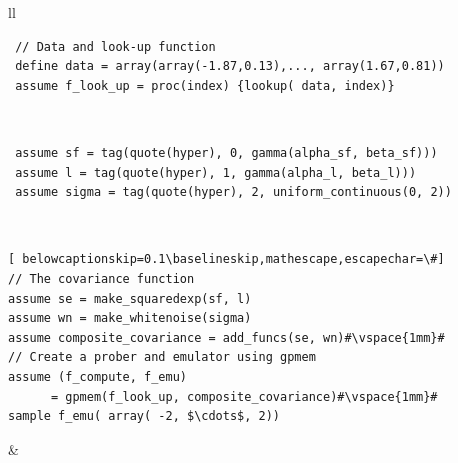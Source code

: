 \begin{tabular}{ll} \hline
{}
  \begin{minipage}{4cm}
 \footnotesize\begin{lstlisting}
 // Data and look-up function
 define data = array(array(-1.87,0.13),..., array(1.67,0.81)) 
 assume f_look_up = proc(index) {lookup( data, index)}
\end{lstlisting}
\end{minipage}\\
\hline
{}
  \begin{minipage}{4cm}
 \footnotesize\begin{lstlisting} 
 assume sf = tag(quote(hyper), 0, gamma(alpha_sf, beta_sf)))
 assume l = tag(quote(hyper), 1, gamma(alpha_l, beta_l)))
 assume sigma = tag(quote(hyper), 2, uniform_continuous(0, 2)) 
\end{lstlisting}
\end{minipage}
  \\
\hline
\footnotesize\begin{lstlisting}[ belowcaptionskip=0.1\baselineskip,mathescape,escapechar=\#]
// The covariance function
assume se = make_squaredexp(sf, l)
assume wn = make_whitenoise(sigma)
assume composite_covariance = add_funcs(se, wn)#\vspace{1mm}#
// Create a prober and emulator using gpmem
assume (f_compute, f_emu)
      = gpmem(f_look_up, composite_covariance)#\vspace{1mm}#
sample f_emu( array( -2, $\cdots$, 2)) 
\end{lstlisting}
 &    \\ \hline


\end{tabular}
